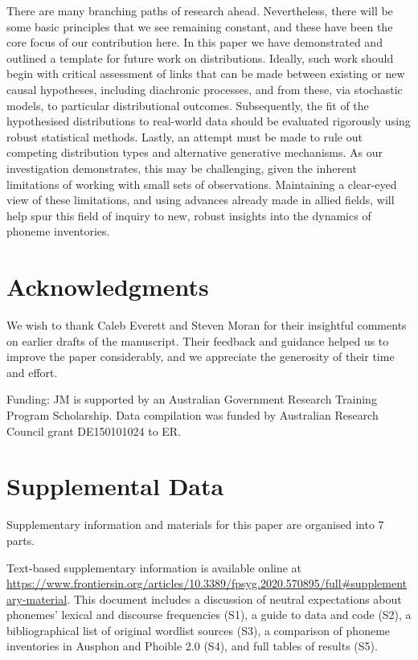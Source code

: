 There are many branching paths of research ahead. Nevertheless, there will be some basic principles that we see remaining constant, and these have been the core focus of our contribution here. In this paper we have demonstrated and outlined a template for future work on distributions. Ideally, such work should begin with critical assessment of links that can be made between existing or new causal hypotheses, including diachronic processes, and from these, via stochastic models, to particular distributional outcomes. Subsequently, the fit of the hypothesised distributions to real-world data should be evaluated rigorously using robust statistical methods. Lastly, an attempt must be made to rule out competing distribution types and alternative generative mechanisms. As our investigation demonstrates, this may be challenging, given the inherent limitations of working with small sets of observations. Maintaining a clear-eyed view of these limitations, and using advances already made in allied fields, will help spur this field of inquiry to new, robust insights into the dynamics of phoneme inventories.

\hypertarget{acknowledgments}{%
\section*{Acknowledgments}\label{acknowledgments}}

We wish to thank Caleb Everett and Steven Moran for their insightful comments on earlier drafts of the manuscript. Their feedback and guidance helped us to improve the paper considerably, and we appreciate the generosity of their time and effort.

Funding: JM is supported by an Australian Government Research Training Program Scholarship. Data compilation was funded by Australian Research Council grant DE150101024 to ER.

\hypertarget{supplemental-data}{%
\section*{Supplemental Data}\label{supplemental-data}}

Supplementary information and materials for this paper are organised into 7 parts.

Text-based supplementary information is available online at \url{https://www.frontiersin.org/articles/10.3389/fpsyg.2020.570895/full\#supplementary-material}. This document includes a discussion of neutral expectations about phonemes' lexical and discourse frequencies (S1), a guide to data and code (S2), a bibliographical list of original wordlist sources (S3), a comparison of phoneme inventories in Ausphon and Phoible 2.0 (S4), and full tables of results (S5).

